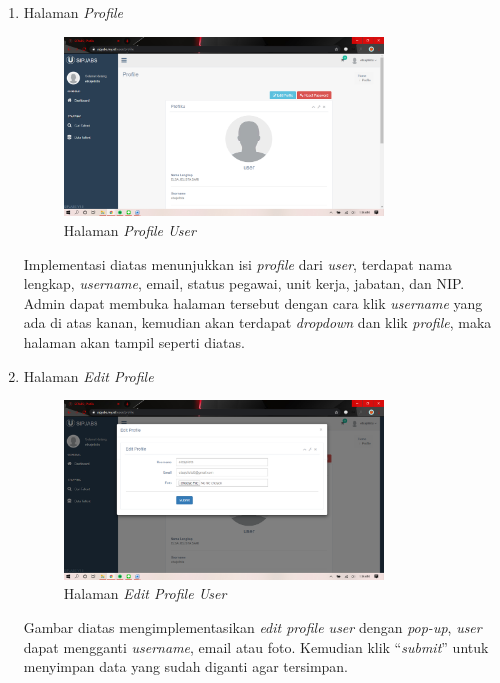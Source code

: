 \begin{enumerate}
	\item Halaman \textit{Profile}
	\begin{figure}
		\centering
		\includegraphics[width=0.8\textwidth]
		{pics/user/implementasi/profile.png}
		\caption{Halaman \textit{Profile User}}
		\label{fig:CC10}
	\end{figure}
	
	Implementasi diatas menunjukkan isi \textit{profile} dari \textit{user}, terdapat nama lengkap, \textit{username}, email, status pegawai, unit kerja, jabatan, dan NIP. Admin dapat membuka halaman tersebut dengan cara klik \textit{username} yang ada di atas kanan, kemudian akan terdapat \textit{dropdown} dan klik \textit{profile}, maka halaman akan tampil seperti diatas. 
	
	\item Halaman \textit{Edit Profile}
	\begin{figure}
		\centering
		\includegraphics[width=0.8\textwidth]
		{pics/user/implementasi/editprofile.png}
		\caption{Halaman \textit{Edit Profile User}}
		\label{fig:CC10}
	\end{figure}
	
	Gambar diatas mengimplementasikan\textit{ edit profile user} dengan \textit{pop-up}, \textit{user} dapat mengganti \textit{username}, email atau foto. Kemudian klik “\textit{submit}” untuk menyimpan data yang sudah diganti agar tersimpan.
	

\end{enumerate}
